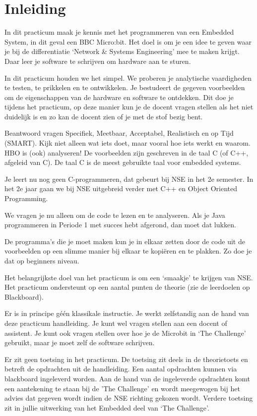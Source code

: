 \chapter{Inleiding}


In dit practicum maak je kennis met het programmeren van een Embedded System, in dit geval een 
BBC Micro:bit. Het doel is om je een idee te geven waar je bij de differentiatie ‘Network \& Systems Engineering’ mee te maken krijgt. Daar leer je software te schrijven om hardware aan te sturen.

In dit practicum houden we het simpel. We proberen je analytische vaardigheden te testen, te prikkelen en te ontwikkelen. Je bestudeert de gegeven voorbeelden om de eigenschappen van de hardware en software te ontdekken. Dit doe je tijdens het practicum, op deze manier kun je de docent vragen stellen als het niet duidelijk is en zo kan de docent zien of je met de stof bezig bent.  

Beantwoord vragen Specifiek, Meetbaar, Acceptabel,  Realistisch en op Tijd (SMART). 
Kijk niet alleen wat iets doet, maar vooral hoe iets werkt en waarom. HBO is (ook) analyseren!
De voorbeelden zijn geschreven in de taal C (of C++, afgeleid van C). De taal C is de meest gebruikte taal voor embedded systems.

Je leert nu nog geen C-programmeren, dat gebeurt bij NSE in het 2e semester. In het 2e jaar gaan we bij NSE uitgebreid verder met C++ en Object Oriented Programming.

We vragen je nu alleen om de code te lezen en te analyseren. Als je Java programmeren in Periode 1 met succes hebt afgerond, dan moet dat lukken. 

De programma’s die je moet maken kun je in elkaar zetten door de code uit de voorbeelden op een slimme manier bij elkaar te kopiëren en te plakken. Zo doe je dat op beginners niveau.

Het belangrijkste doel van het practicum is om een ‘smaakje’ te krijgen van NSE. 
Het practicum ondersteunt op een aantal punten de theorie (zie de leerdoelen op Blackboard). 

Er is in principe géén klassikale instructie. Je werkt zelfstandig aan de hand van deze practicum handleiding. Je kunt wel vragen stellen aan een docent of assistent. Je kunt ook vragen stellen over hoe je de Microbit in ‘The Challenge’ gebruikt, maar je moet zelf de software schrijven.

Er zit geen toetsing in het practicum. De toetsing zit deels in de theorietoets en betreft de opdrachten uit de handleiding. Een aantal opdrachten kunnen via blackboard ingeleverd worden. Aan de hand van de ingeleverde opdrachten komt een aantekening te staan bij de 'The Challenge' en wordt meegewogen bij het advies dat gegeven wordt indien de NSE richting gekozen wordt. Verdere toetsing zit in jullie uitwerking van het Embedded deel van ‘The Challenge’.

